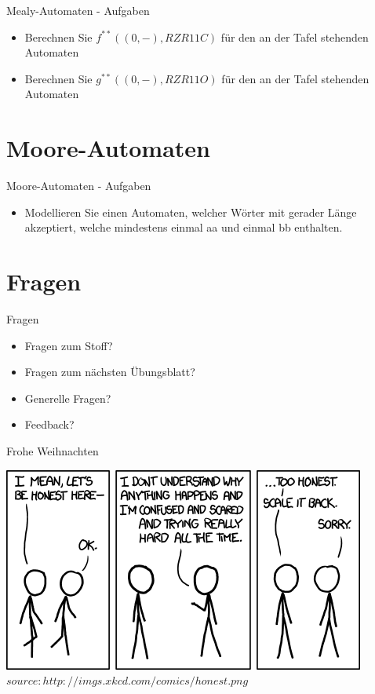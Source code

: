 	
	\begin{frame}{Mealy-Automaten - Aufgaben}
		\begin{itemize}
			\item Berechnen Sie $f^{**}((0,-), RZR11C)$ für den an der Tafel stehenden Automaten
			\item Berechnen Sie $g^{**}((0,-), RZR11O)$ für den an der Tafel stehenden Automaten
		\end{itemize}
	\end{frame}
	
	
	
	\section{Moore-Automaten}
	
	
	\begin{frame}{Moore-Automaten - Aufgaben}
		\begin{itemize}
			\item Modellieren Sie einen Automaten, welcher Wörter mit gerader Länge akzeptiert, welche mindestens einmal aa und einmal bb enthalten.
		\end{itemize}
	\end{frame}
	
	\section{Fragen}
	\begin{frame} {Fragen}
		\begin{itemize}
			\item Fragen zum Stoff?
			\item Fragen zum n\"achsten \"Ubungsblatt?
			\item Generelle Fragen?
			\item Feedback?
		\end{itemize}
	\end{frame}

		
	\begin{frame} {Frohe Weihnachten}
		\begin{center}
			\includegraphics[scale=0.65]{graphics/eof10.png}\\
			\tiny $source: http://imgs.xkcd.com/comics/honest.png$
		\end{center}
	\end{frame}



